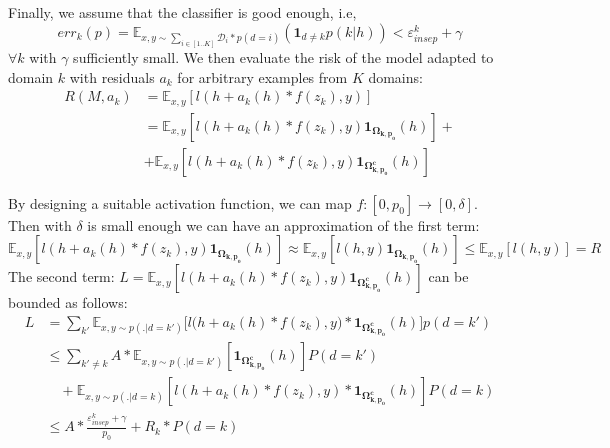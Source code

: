 \documentclass[12pt,a4paper,twoside]{report}
\theoremstyle{definition}
\begin{document}
Finally, we assume that the classifier is good enough, i.e, $$err_k(p) = \mathbb{E}_{x,y \sim \sum_{i\in [1..K]} \mathcal{D}_{i}*p(d=i)}(\mathbf{1}_{d\neq k} p(k|h)) < \varepsilon_{insep}^k + \gamma$$ $\forall k$ with $\gamma$ sufficiently small.
We then evaluate the risk of the model adapted to domain $k$ with residuals $a_k$ for arbitrary examples from $K$ domains:
\begin{equation}
\begin{split}
  R(M,a_k) &= \mathbb{E}_{x,y}[l(h + a_k(h) * f(z_k),y)] \\
  &= \mathbb{E}_{x,y}[l(h + a_k(h) * f(z_k),y)\mathbf{1}_{\mathbf{\Omega_{k,p_{0}}}}(h)] + \\
  &+ \mathbb{E}_{x,y}[l(h + a_k(h) * f(z_k),y) \mathbf{1}_{\mathbf{\Omega_{k,p_{0}}^{c}}}(h)]
\end{split}
\end{equation}

By designing a suitable activation function, we can map $f: [0,p_{0}] \rightarrow [0,\delta]$. Then with $\delta$ is small enough we can have an approximation of the first term:
\begin{equation}
\mathbb{E}_{x,y}[l(h + a_k(h) * f(z_k),y)\mathbf{1}_{\mathbf{\Omega_{k,p_{0}}}}(h)] \approx{} \mathbb{E}_{x,y}[l(h,y)\mathbf{1}_\mathbf{\Omega_{k,p_{0}}}(h)] \leq \mathbb{E}_{x,y}[l(h,y)] = R
\label{eq:4}
\end{equation}
The second term: $ L = \mathbb{E}_{x,y}[l(h + a_k(h) * f(z_k),y) \mathbf{1}_{\mathbf{\Omega_{k,p_{0}}^{c}}}(h)]$ can be bounded as follows:
\begin{equation*}
\begin{split}
L &= \displaystyle{\mathop{\sum}_{k'}\mathbb{E}_{x,y \sim p(.|d=k')}[l(h } + a_k(h) * f(z_k),y) * \mathbf{1}_{\mathbf{\Omega_{k,p_{0}}^{c}}}(h)]p(d=k') \\
	& \leq \displaystyle{\mathop{\sum}_{k' \neq k}} A * \mathbb{E}_{x,y \sim p(.|d=k')} [\mathbf{1}_{\mathbf{\Omega_{k,p_{0}}^{c}}}(h)]P(d=k') \\
	& \quad + \mathbb{E}_{x,y \sim p(.|d=k)}[l(h + a_k(h) * f(z_k),y) * \mathbf{1}_{\mathbf{\Omega_{k,p_{0}}^{c}}}(h)]P(d=k) \\
	&\leq A * \frac{\mathbb{\varepsilon}_{insep}^k + \gamma}{p_{0}} + R_k * P(d=k)
\end{split}
\label{eq:5}
\end{equation*}
\end{document}

